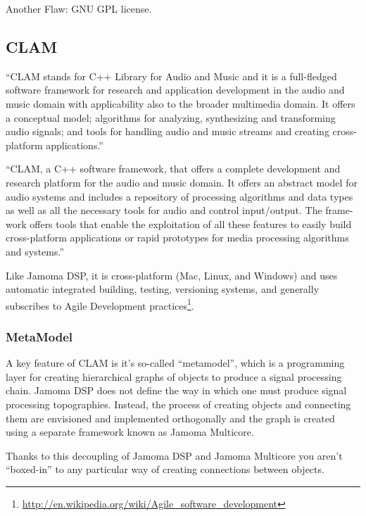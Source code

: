 \documentclass[twoside,10pt]{article}
\begin{document}
Another Flaw: GNU GPL license.




\subsection{CLAM} %

``CLAM stands for C++ Library for Audio and Music and it is a full-fledged software framework for research and application development in the audio and music domain with applicability also to the broader multimedia domain.   It offers a conceptual model; algorithms for analyzing, synthesizing and transforming audio signals; and tools for handling audio and music streams and creating cross-platform applications.''

``CLAM, a C++ software framework, that offers a complete development and research platform for the audio and music domain. It offers an abstract model for audio systems and includes a repository of processing algorithms and data types as well as all the necessary tools for audio and control input/output. The frame- work offers tools that enable the exploitation of all these features to easily build cross-platform applications or rapid prototypes for media processing algorithms and systems.'' \cite{Amatraian:2008}

Like Jamoma DSP, it is cross-platform (Mac, Linux, and Windows) and uses automatic integrated building, testing, versioning systems, and generally subscribes to Agile Development practices\footnote{\url{http://en.wikipedia.org/wiki/Agile_software_development}}.  
                                      
\subsubsection{MetaModel}

A key feature of CLAM is it's so-called ``metamodel'', which is a programming layer for creating hierarchical graphs of objects to produce a signal processing chain.  Jamoma DSP does not define the way in which one must produce signal processing topographies.  Instead, the process of creating objects and connecting them are envisioned and implemented orthogonally and the graph is created using a separate framework known as Jamoma Multicore.

Thanks to this decoupling of Jamoma DSP and Jamoma Multicore you aren't ``boxed-in'' to any particular way of creating connections between objects.
\end{document}

